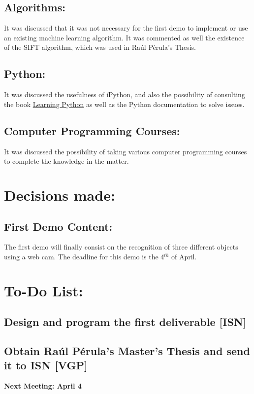 \documentclass{article}
\newenvironment{myindentpar}[1]%
 {\begin{list}{}%
         {\setlength{\leftmargin}{#1}}%
         \item[]%
 }
 {\end{list}}
\begin{document}
		\subsection{Algorithms:}
		\begin{myindentpar}{1cm}
		It was discussed that it was not necessary for the first demo to implement or use an existing machine learning algorithm. It was commented as well the existence of the SIFT algorithm, which was used in Raúl Pérula's Thesis. 
		\end{myindentpar}
		\subsection{Python:}
		\begin{myindentpar}{1cm}
		It was discussed the usefulness of iPython, and also the possibility of consulting the book \underline{Learning Python} as well as the Python documentation to solve issues.  
		\end{myindentpar}		

		\subsection{Computer Programming Courses:}
		\begin{myindentpar}{1cm}
		It was discussed the possibility of taking various computer programming courses to complete the knowledge in the matter.
		\end{myindentpar}
			

	




\section{\LARGE Decisions made:}

		\subsection{First Demo Content: }
		\begin{myindentpar}{1cm}
			The first demo will finally consist on the recognition of three different objects using a web cam. The deadline for this demo is the 4$^{th}$ of April. 
		\end{myindentpar}



\section{\LARGE To-Do List: }


		\subsection{Design and program the first deliverable [ISN]}
		\subsection{Obtain Raúl Pérula's Master's Thesis and send it to ISN [VGP]}
		
			

	
	


\vspace{1cm}
\begin {center}
{\Large \textbf{Next Meeting: April 4}}
\end{center}
\end{document}
